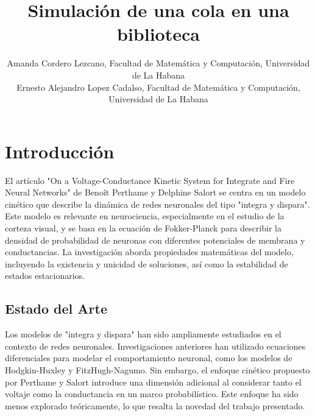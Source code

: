 \documentclass[10pt,twocolumn]{article}
\begin{document}
\title{Simulación de una cola en una biblioteca}
\author{
	Amanda Cordero Lezcano, Facultad de Matemática y Computación, Universidad de La Habana\\
	Ernesto Alejandro Lopez Cadalso, Facultad de Matemática y Computación, Universidad de La Habana\\
}





\section{Introducción}
El artículo "On a Voltage-Conductance Kinetic System for Integrate and Fire Neural Networks" de Benoît Perthame y Delphine Salort se centra en un modelo cinético que describe la dinámica de redes neuronales del tipo "integra y dispara". Este modelo es relevante en neurociencia, especialmente en el estudio de la corteza visual, y se basa en la ecuación de Fokker-Planck para describir la densidad de probabilidad de neuronas con diferentes potenciales de membrana y conductancias. La investigación aborda propiedades matemáticas del modelo, incluyendo la existencia y unicidad de soluciones, así como la estabilidad de estados estacionarios.

\subsection{Estado del Arte}
Los modelos de "integra y dispara" han sido ampliamente estudiados en el contexto de redes neuronales. Investigaciones anteriores han utilizado ecuaciones diferenciales para modelar el comportamiento neuronal, como los modelos de Hodgkin-Huxley y FitzHugh-Nagumo. Sin embargo, el enfoque cinético propuesto por Perthame y Salort introduce una dimensión adicional al considerar tanto el voltaje como la conductancia en un marco probabilístico. Este enfoque ha sido menos explorado teóricamente, lo que resalta la novedad del trabajo presentado.
\end{document}
